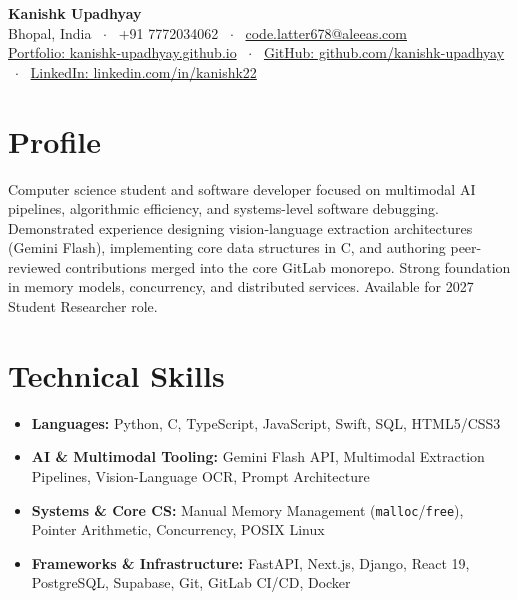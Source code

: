 \documentclass[10pt,a4paper]{article}
\begin{document}
\begin{center}
    {\huge \textbf{Kanishk Upadhyay}} \\ \vspace{2pt}
    Bhopal, India \ $\cdot$ \ +91 7772034062 \ $\cdot$ \ \href{mailto:code.latter678@aleeas.com}{code.latter678@aleeas.com} \\ \vspace{2pt}
    \href{https://kanishk-upadhyay.github.io/}{Portfolio: kanishk-upadhyay.github.io} \ $\cdot$ \ 
    \href{https://github.com/kanishk-upadhyay}{GitHub: github.com/kanishk-upadhyay} \ $\cdot$ \ 
    \href{https://linkedin.com/in/kanishk22}{LinkedIn: linkedin.com/in/kanishk22}
\end{center}

\vspace{-6pt}
\section{Profile}
Computer science student and software developer focused on multimodal AI pipelines, algorithmic efficiency, and systems-level software debugging. Demonstrated experience designing vision-language extraction architectures (Gemini Flash), implementing core data structures in C, and authoring peer-reviewed contributions merged into the core GitLab monorepo. Strong foundation in memory models, concurrency, and distributed services. Available for 2027 Student Researcher role.

\section{Technical Skills}
\begin{itemize}
    \item \textbf{Languages:} Python, C, TypeScript, JavaScript, Swift, SQL, HTML5/CSS3
    \item \textbf{AI \& Multimodal Tooling:} Gemini Flash API, Multimodal Extraction Pipelines, Vision-Language OCR, Prompt Architecture
    \item \textbf{Systems \& Core CS:} Manual Memory Management (\texttt{malloc}/\texttt{free}), Pointer Arithmetic, Concurrency, POSIX Linux
    \item \textbf{Frameworks \& Infrastructure:} FastAPI, Next.js, Django, React 19, PostgreSQL, Supabase, Git, GitLab CI/CD, Docker
\end{itemize}
\end{document}
